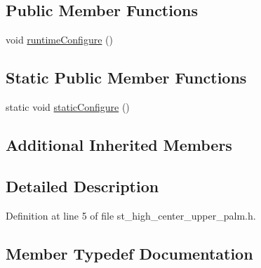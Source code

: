 \subsection*{Public Member Functions}
\begin{DoxyCompactItemize}
\item 
void \hyperlink{structsm__moveit__3_1_1StHighCenterUpperPalm_abe603caed1d44c662d4bf6e18159d828}{runtime\+Configure} ()
\end{DoxyCompactItemize}
\subsection*{Static Public Member Functions}
\begin{DoxyCompactItemize}
\item 
static void \hyperlink{structsm__moveit__3_1_1StHighCenterUpperPalm_a705bd1c18cc11fd277a81d1e0bc46446}{static\+Configure} ()
\end{DoxyCompactItemize}
\subsection*{Additional Inherited Members}


\subsection{Detailed Description}


Definition at line 5 of file st\+\_\+high\+\_\+center\+\_\+upper\+\_\+palm.\+h.



\subsection{Member Typedef Documentation}
\mbox{\label{structsm__moveit__3_1_1StHighCenterUpperPalm_aad95efec300751f5b6021f941c660dbe}} 
